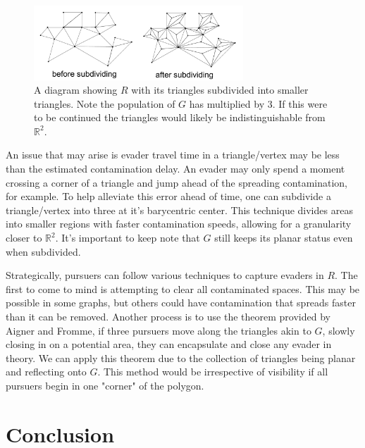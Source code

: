 \documentclass{article}
\begin{document}
\begin{figure}[htb]
\centering
\includegraphics[width=0.7\textwidth]{"tesslation"}
\caption{A diagram showing \(R\) with its triangles subdivided into smaller triangles. Note the population of \(G\) has multiplied by 3. If this were to be continued the triangles would likely be indistinguishable from \(\mathbb{R}^2\).}
\end{figure}

An issue that may arise is evader travel time in a triangle/vertex may be less than the estimated contamination delay. An evader may only spend a moment crossing a corner of a triangle and jump ahead of the spreading contamination, for example. To help alleviate this error ahead of time, one can subdivide a triangle/vertex into three at it's barycentric center. This technique divides areas into smaller regions with faster contamination speeds, allowing for a granularity closer to \(\mathbb{R}^2\). It's important to keep note that \(G\) still keeps its planar status even when subdivided.

Strategically, pursuers can follow various techniques to capture evaders in \(R\). The first to come to mind is attempting to clear all contaminated spaces. This may be possible in some graphs, but others could have contamination that spreads faster than it can be removed. Another process is to use the theorem provided by Aigner and Fromme, if three pursuers move along the triangles akin to \(G\), slowly closing in on a potential area, they can encapsulate and close any evader in theory. We can apply this theorem due to the collection of triangles being planar and reflecting onto \(G\). This method would be irrespective of visibility if all pursuers begin in one "corner" of the polygon. 

\section{Conclusion}
\end{document}
